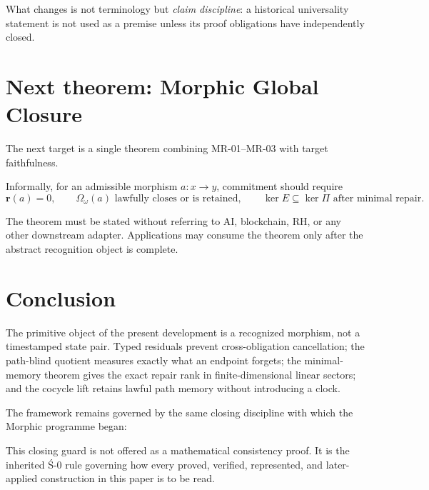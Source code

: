 \documentclass[11pt]{article}
\begin{document}
What changes is not terminology but \emph{claim discipline}: a historical universality statement is not used as a premise unless its proof obligations have independently closed.

\section{Next theorem: Morphic Global Closure}

The next target is a single theorem combining MR-01--MR-03 with target faithfulness.

Informally, for an admissible morphism \(a:x\to y\), commitment should require
\[
\boxed{
\mathbf r(a)=0,
\qquad
\Omega_\omega(a)\text{ lawfully closes or is retained},
\qquad
\ker E\subseteq\ker\Pi\text{ after minimal repair}.
}
\]

The theorem must be stated without referring to AI, blockchain, RH, or any other downstream adapter. Applications may consume the theorem only after the abstract recognition object is complete.

\section{Conclusion}

The primitive object of the present development is a recognized morphism, not a timestamped state pair. Typed residuals prevent cross-obligation cancellation; the path-blind quotient measures exactly what an endpoint forgets; the minimal-memory theorem gives the exact repair rank in finite-dimensional linear sectors; and the cocycle lift retains lawful path memory without introducing a clock.

The framework remains governed by the same closing discipline with which the Morphic programme began:

\begin{center}
\end{center}

This closing guard is not offered as a mathematical consistency proof. It is the inherited Ś-0 rule governing how every proved, verified, represented, and later-applied construction in this paper is to be read.
\end{document}
